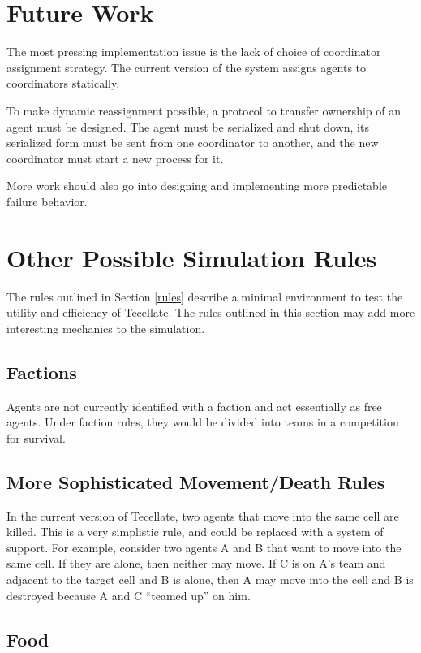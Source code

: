 \section{Future Work}

The most pressing implementation issue is the lack of choice of coordinator assignment strategy. The
current version of the system assigns agents to coordinators statically.

To make dynamic reassignment possible, a protocol to transfer ownership of an agent must be
designed. The agent must be serialized and shut down, its serialized form must be sent from one
coordinator to another, and the new coordinator must start a new process for it.

More work should also go into designing and implementing more predictable failure behavior.

\section{Other Possible Simulation Rules}

The rules outlined in Section \ref{rules} describe a minimal environment to test the utility and
efficiency of Tecellate. The rules outlined in this section may add more interesting mechanics to
the simulation.

\subsection{Factions}

Agents are not currently identified with a faction and act essentially as free agents. Under faction
rules, they would be divided into teams in a competition for survival.

\subsection{More Sophisticated Movement/Death Rules}

In the current version of Tecellate, two agents that move into the same cell are killed. This is a
very simplistic rule, and could be replaced with a system of support. For example, consider two
agents A and B that want to move into the same cell. If they are alone, then neither may move. If C
is on A's team and adjacent to the target cell and B is alone, then A may move into the cell and B
is destroyed because A and C ``teamed up'' on him.

\subsection{Food}

